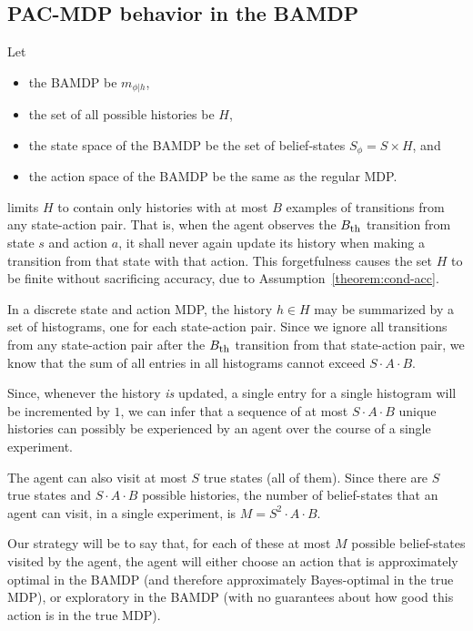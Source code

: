 \subsection{PAC-MDP behavior in the BAMDP}

Let
\begin{itemize}
\item the BAMDP be $m_{\phi|h}$,
\item the set of all possible histories be $H$,
\item the state space of the BAMDP be the set of belief-states $S_\phi = S \times H$, and
\item the action space of the BAMDP be the same as the regular MDP.
\end{itemize}

 limits $H$ to contain only histories with at most $B$ examples of transitions from any state-action pair. That is, when the agent observes the $B_{\mbox{\footnotesize{th}}}$ transition from state $s$ and action $a$, it shall never again update its history when making a transition from that state with that action. This forgetfulness causes the set $H$ to be finite without sacrificing accuracy, due to Assumption~\ref{theorem:cond-acc}.

In a discrete state and action MDP, the history $h\in H$ may be summarized by a set of histograms, one for each state-action pair. Since we ignore all transitions from any state-action pair after the $B_{\mbox{\footnotesize{th}}}$ transition from that state-action pair, we know that the sum of all entries in all histograms cannot exceed $S\cdot A \cdot B$.

Since, whenever the history \emph{is} updated, a single entry for a single histogram will be incremented by $1$, we can infer that a sequence of at most $S\cdot A \cdot B$ unique histories can possibly be experienced by an agent over the course of a single experiment.

The agent can also visit at most $S$ true states (all of them). Since there are $S$ true states and $S\cdot A \cdot B$ possible histories, the number of belief-states that an agent can visit, in a single experiment, is $M = S^2\cdot A \cdot B$.

Our strategy will be to say that, for each of these at most $M$ possible belief-states visited by the agent, the agent will either choose an action that is approximately optimal in the BAMDP (and therefore approximately Bayes-optimal in the true MDP), or exploratory in the BAMDP (with no guarantees about how good this action is in the true MDP).

